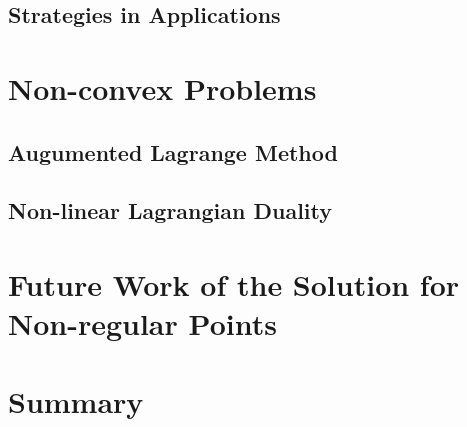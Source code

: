 \subsection{Strategies in Applications}

\section{Non-convex Problems}
\label{sec:non-convex-sol}
\subsection{Augumented Lagrange Method}
\subsection{Non-linear Lagrangian Duality}



\section{Future Work of the Solution for Non-regular Points}
\label{sec:futurework-non}


\section{Summary}
